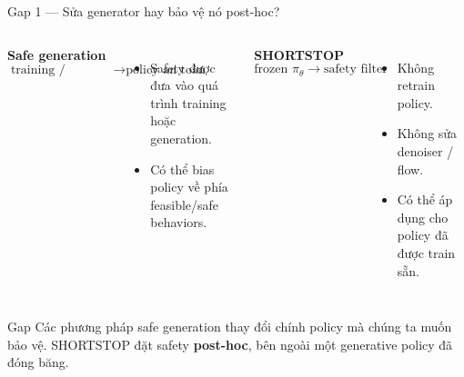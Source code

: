\documentclass[aspectratio=169]{beamer}
\begin{document}
\begin{frame}[t,shrink=8]{Gap 1 --- Sửa generator hay bảo vệ nó post-hoc?}
\begin{columns}[T]

\textbf{Safe generation}
\[
\text{training / sampling}
\rightarrow
\text{policy an toàn hơn}
\]
\begin{itemize}
    \item Safety được đưa vào quá trình training hoặc generation.
    \item Có thể bias policy về phía feasible/safe behaviors.
\end{itemize}

\textbf{SHORTSTOP}
\[
\text{frozen }\pi_\theta
\rightarrow
\text{safety filter}
\]
\begin{itemize}
    \item Không retrain policy.
    \item Không sửa denoiser / flow.
    \item Có thể áp dụng cho policy đã được train sẵn.
\end{itemize}

\end{columns}
\vspace{6pt}

\begin{alertblock}{Gap}
Các phương pháp safe generation thay đổi chính policy mà chúng ta muốn
bảo vệ. SHORTSTOP đặt safety \textbf{post-hoc}, bên ngoài một
generative policy đã đóng băng.
\end{alertblock}
\end{frame}

\end{document}

